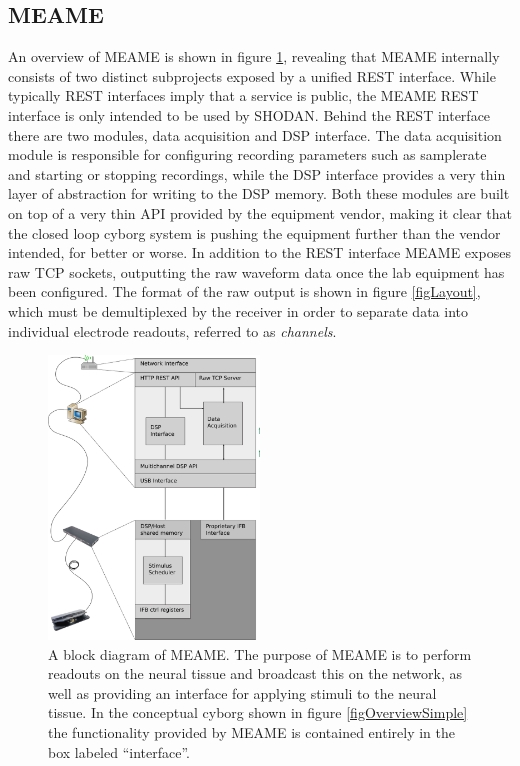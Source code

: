 \subsection{MEAME}
An overview of MEAME is shown in figure \ref{figMEAME}, revealing that MEAME internally
consists of two distinct subprojects exposed by a unified REST interface.
While typically REST interfaces imply that a service is public, the MEAME REST
interface is only intended to be used by SHODAN.
%
Behind the REST interface there are two modules, data acquisition and DSP interface.
%
The data acquisition module is responsible for configuring recording parameters
such as samplerate and starting or stopping recordings, while the DSP interface
provides a very thin layer of abstraction for writing to the DSP memory.
%
Both these modules are built on top of a very thin API provided by the equipment
vendor, making it clear that the closed loop cyborg system is pushing the
equipment further than the vendor intended, for better or worse.
%
In addition to the REST interface MEAME exposes raw TCP sockets, outputting the
raw waveform data once the lab equipment has been configured.
%
The format of the raw output is shown in figure \ref{figLayout}, which must be
demultiplexed by the receiver in order to separate data into individual
electrode readouts, referred to as \emph{channels}.
%
\begin{figure}[h!]
  \centering
  \includegraphics[width=0.5\textwidth]{fig/MEAME.png}
  \caption{
    A block diagram of MEAME.
    The purpose of MEAME is to perform readouts on the neural tissue and
    broadcast this on the network, as well as providing an interface for
    applying stimuli to the neural tissue.
    In the conceptual cyborg shown in figure \ref{figOverviewSimple} the
    functionality provided by MEAME is contained entirely in the box labeled
    ``interface''.
  }
  \label{figMEAME}
\end{figure}

